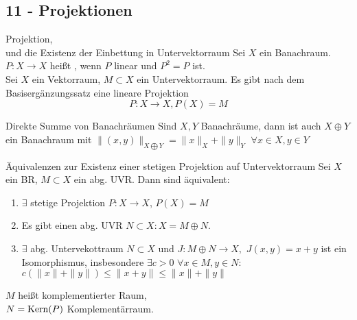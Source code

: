 \subsection*{11 - Projektionen}

	\begin{karte}{Projektion, \\ und die Existenz der Einbettung in Untervektorraum}
	Sei $X$ ein Banachraum. $P \colon X \rightarrow X$ hei{\ss}t , wenn $P$ linear und $P^{2} = P$ ist. \\


	Sei $X$ ein Vektorraum, $M \subset X$ ein Untervektorraum. Es gibt nach dem Basisergänzungssatz eine lineare Projektion 
		\[ P \colon X \rightarrow X, P(X) = M \]	
	\end{karte}

	\begin{karte}{Direkte Summe von Banachräumen}
	Sind $X, Y$ Banachräume, dann ist auch $X \oplus Y$ ein Banachraum mit $\| (x, y) \|_{X \bigoplus Y} = \| x \|_{X} + \| y \|_{Y}$ $\forall x \in X, y \in Y$
	\end{karte}

	\begin{karte}{Äquivalenzen zur Existenz einer stetigen Projektion auf Untervektorraum}
	Sei $X$ ein BR, $M \subset X$ ein abg. UVR. Dann sind äquivalent:
	\begin{enumerate}[label=\alph*\upshape)]
		\item $\exists$ stetige Projektion $P \colon X \rightarrow X$, $P(X) = M$
		\item Es gibt einen abg. UVR $N \subset X: X = M \oplus N$.
		\item $\exists$ abg. Untervekottraum $N \subset X$ und $J: M \oplus N \rightarrow X,$ $J(x, y) = x + y$ ist ein Isomorphismus, insbesondere $\exists c > 0$ $\forall x \in M, y \in N:$ $c \left( \|x \| + \|y \| \right) \leq \|x + y \| \leq \|x \| + \| y \| $
	\end{enumerate}
	$M$ hei{\ss}t komplementierter Raum, \\
	$N = \mathop{\rm Kern}\nolimits(P)$ Komplementärraum.
	\end{karte}